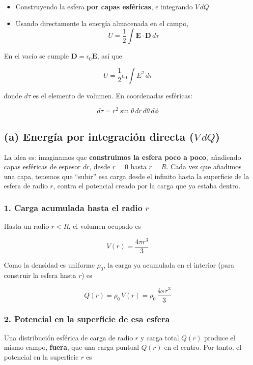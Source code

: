 \documentclass{article}
\begin{document}
\begin{itemize}
  \item[(a)] Construyendo la esfera \textbf{por capas esféricas}, e integrando $V\,dQ$
  \item[(b)] Usando directamente la energía almacenada en el campo,
    \[
      U = \frac{1}{2}\int \mathbf{E}\cdot\mathbf{D}\,d\tau
    \]
\end{itemize}

En el vacío se cumple $\mathbf{D} = \epsilon_{0}\mathbf{E}$, así que

\[
U = \frac{1}{2}\epsilon_{0}\int E^{2}\,d\tau
\]

donde $d\tau$ es el elemento de volumen. En coordenadas esféricas:

\[
d\tau = r^{2}\sin\theta\,dr\,d\theta\,d\phi
\]

\subsection*{(a) Energía por integración directa ($V\,dQ$)}

La idea es: imaginamos que \textbf{construimos la esfera poco a poco}, añadiendo capas esféricas de espesor $dr$, desde $r=0$ hasta $r=R$. Cada vez que añadimos una capa, tenemos que “subir” esa carga desde el infinito hasta la superficie de la esfera de radio $r$, contra el potencial creado por la carga que ya estaba dentro.

\subsubsection*{1. Carga acumulada hasta el radio $r$}

Hasta un radio $r<R$, el volumen ocupado es

\[
V(r) = \frac{4\pi r^{3}}{3}
\]

Como la densidad es uniforme $\rho_{0}$, la carga ya acumulada en el interior (para construir la esfera hasta $r$) es

\begin{equation}
Q(r) = \rho_{0}\,V(r) = \rho_{0}\,\frac{4\pi r^{3}}{3}
\label{eq:Qr}
\end{equation}

\subsubsection*{2. Potencial en la superficie de esa esfera}

Una distribución esférica de carga de radio $r$ y carga total $Q(r)$ produce el mismo campo, \textbf{fuera}, que una carga puntual $Q(r)$ en el centro. Por tanto, el potencial en la superficie $r$ es
\end{document}
